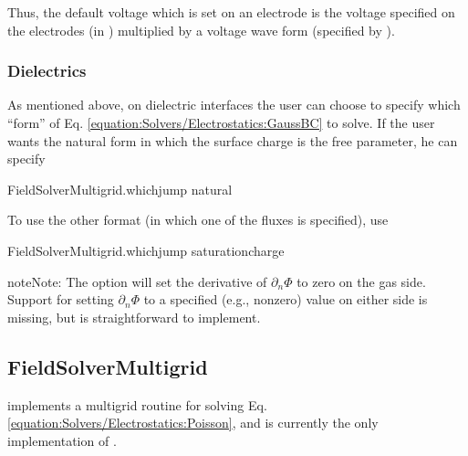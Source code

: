 \documentclass[letterpaper,10pt,english]{sphinxmanual}
\begin{document}
Thus, the default voltage which is set on an electrode is the voltage  specified on the electrodes (in ) multiplied by a voltage wave form (specified by ).


\subsubsection{Dielectrics}
\label{\detokenize{Solvers/Electrostatics:dielectrics}}\label{\detokenize{Solvers/Electrostatics:chap-poissondielectricbc}}
As mentioned above, on dielectric interfaces the user can choose to specify which “form” of Eq. \ref{equation:Solvers/Electrostatics:GaussBC} to solve.
If the user wants the natural form in which the surface charge is the free parameter, he can specify

\begin{sphinxVerbatim}[commandchars=\\\{\},formatcom=\scriptsize]
FieldSolverMultigrid.which\PYGZus{}jump  natural
\end{sphinxVerbatim}

To use the other format (in which one of the fluxes is specified), use

\begin{sphinxVerbatim}[commandchars=\\\{\},formatcom=\scriptsize]
FieldSolverMultigrid.which\PYGZus{}jump  saturation\PYGZus{}charge
\end{sphinxVerbatim}

\begin{sphinxadmonition}{note}{Note:}
The  option will set the derivative of \(\partial_n\Phi\) to zero on the gas side.
Support for setting \(\partial_n\Phi\) to a specified (e.g., non\sphinxhyphen{}zero) value on either side is missing, but is straightforward to implement.
\end{sphinxadmonition}


\subsection{FieldSolverMultigrid}
\label{\detokenize{Solvers/Electrostatics:fieldsolvermultigrid}}\label{\detokenize{Solvers/Electrostatics:chap-fieldsolvermultigrid}}\label{\detokenize{Solvers/Electrostatics:chap-electrostaticdispersion}}
 implements a multigrid routine for solving Eq. \ref{equation:Solvers/Electrostatics:Poisson}, and is currently the only implementation of .
\end{document}
